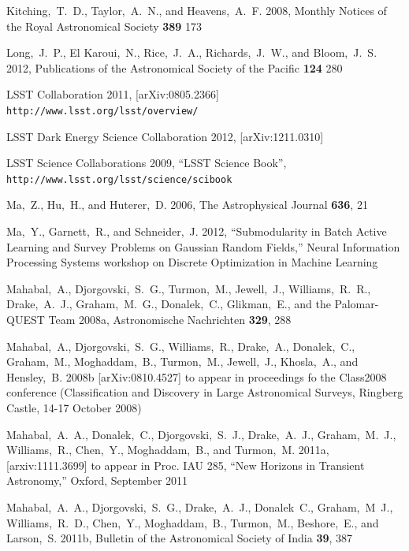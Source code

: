 \documentclass[useAMS,usenatbib,tightenlines,11pt,preprint]{aastex}
\begin{document}
\begin{thebibliography}{99}
Kitching,~T.~D., Taylor,~A.~N., and Heavens,~A.~F. 2008,
Monthly Notices of the Royal Astronomical Society {\bf 389} 173

Long,~J.~P., El Karoui,~N., Rice,~J.~A., Richards,~J.~W., and Bloom,~J.~S. 2012,
Publications of the Astronomical Society of the Pacific {\bf 124} 280

LSST Collaboration 2011, [arXiv:0805.2366]
\verb|http://www.lsst.org/lsst/overview/|

LSST Dark Energy Science Collaboration 2012, [arXiv:1211.0310]

LSST Science Collaborations 2009, ``LSST Science Book'',
\verb|http://www.lsst.org/lsst/science/scibook|

Ma,~Z., Hu,~H., and Huterer,~D. 2006, The Astrophysical Journal {\bf 636}, 21

Ma,~Y., Garnett,~R., and Schneider,~J. 2012,
``Submodularity in Batch Active Learning and Survey Problems
on Gaussian Random Fields,''
Neural Information Processing Systems 
workshop on Discrete Optimization in Machine Learning

Mahabal,~A., Djorgovski,~S.~G., Turmon,~M., Jewell,~J., Williams,~R.~R.,
Drake,~A.~J., Graham,~M.~G., Donalek,~C., Glikman,~E., and the Palomar-QUEST Team
2008a, Astronomische Nachrichten {\bf 329}, 288

Mahabal,~A., Djorgovski,~S.~G., Williams,~R., Drake,~A., Donalek,~C.,
Graham,~M., Moghaddam,~B., Turmon,~M., Jewell,~J., Khosla,~A., and
Hensley,~B. 2008b [arXiv:0810.4527] to appear in proceedings fo the Class2008
conference (Classification and Discovery in Large Astronomical Surveys, Ringberg
Castle, 14-17 October 2008)

Mahabal,~A.~A., Donalek,~C., Djorgovski,~S.~J., Drake,~A.~J.,
Graham,~M.~J., Williams,~R., Chen,~Y., Moghaddam,~B., and Turmon,~M.
2011a, [arxiv:1111.3699] to appear in Proc. IAU 285, ``New Horizons in Transient
Astronomy,'' Oxford, September 2011

Mahabal,~A.~A., Djorgovski,~S.~G., Drake,~A.~J., Donalek~C., Graham,~M~J.,
Williams,~R.~D., Chen,~Y., Moghaddam,~B., Turmon,~M., Beshore,~E., and Larson,~S.
2011b, Bulletin of the Astronomical Society of India {\bf 39}, 387


\end{thebibliography}
\end{document}
